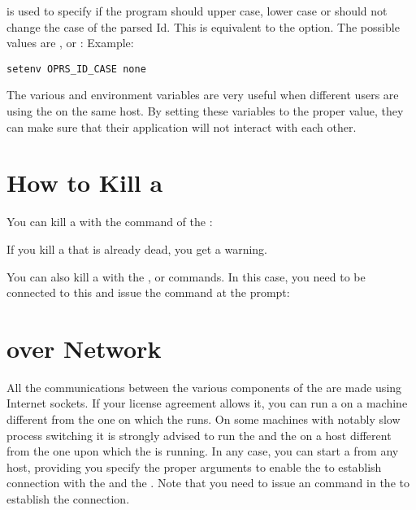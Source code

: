 \begin{description}
\item[\code{OPRS\_ID\_CASE}] is used to specify if the program should upper case,
lower case or should not change the case of the parsed Id. This is equivalent
to the  option. The possible values
are ,  or :\*
Example:
\begin{verbatim}
setenv OPRS_ID_CASE none
\end{verbatim}

\end{description}

The various  and  environment variables are very
useful when different users are using the \COPRSDE{} on the same host. By setting
these variables to the proper value, they can make sure that their application
will not interact with each other.

\section{How to Kill a \CPK{}}

You can kill a \CPK{} with the  command of the
\OPRSS{}:


If you kill a \CPK{}that is already dead, you get a warning.

You can also kill a \CPK{} with the ,  or 
commands. In this case, you need to be connected to this \COPRS{} and issue the
command at the prompt:


\section{\CPK{} over Network}

All the communications between the various components of the \COPRSDE{} are made
using Internet sockets. If your license agreement allows it, you can
run a \CPK{} on a machine different from the one on which the \OPRSS{}
runs. On some machines with notably slow process switching it is strongly
advised to run the \OPRSS{} and the \MPA{} on a host different from the one
upon which the \CPK{} is running. In any case, you can start a \CPK{} from any
host, providing you specify the proper arguments to enable the \CPK{} to
establish connection with the \OPRSS{} and the \MPA{}. Note that you need to
issue an  command in the \OPRSS{} to establish the connection.

